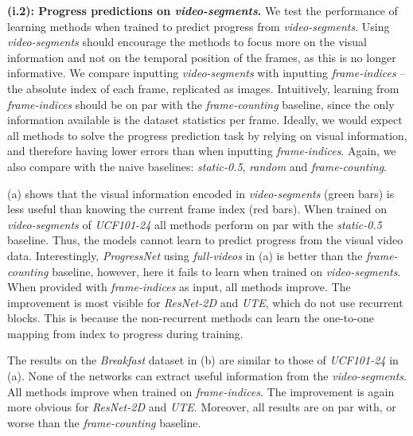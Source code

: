 \medskip\noindent\textbf{(i.2): Progress predictions on \textsl{video-segments}.}
We test the performance of learning methods when trained to predict progress from \textsl{video-segments}.
Using \textsl{video-segments} should encourage the methods to focus more on the visual information and not on the temporal position of the frames, as this is no longer informative. 
We compare inputting \textsl{video-segments} with inputting \textsl{frame-indices} -- the absolute index of each frame, replicated as images.
Intuitively, learning from \textsl{frame-indices} should be on par with the \textsl{frame-counting} baseline, since the only information available is the dataset statistics per frame.
Ideally, we would expect all methods to solve the progress prediction task by relying on visual information, and therefore having lower errors than when inputting \textsl{frame-indices}.
Again, we also compare with the naive baselines: \textsl{static-0.5}, \textsl{random} and \textsl{frame-counting}. 

(a) shows that the visual information encoded in \textsl{video-segments} (green bars) is less useful than knowing the current frame index (red bars).
When trained on \textsl{video-segments} of \textsl{UCF101-24} all methods perform on par with the \textsl{static-0.5} baseline.
Thus, the models cannot learn to predict progress from the visual video data. 
Interestingly, \textsl{ProgressNet} using \textsl{full-videos} in (a) is better than the \textsl{frame-counting} baseline, however, here it fails to learn when trained on \textsl{video-segments}. 
When provided with \textsl{frame-indices} as input, all methods improve. 
The improvement is most visible for \textsl{ResNet-2D} and \textsl{UTE}, which do not use recurrent blocks. 
This is because the non-recurrent methods can learn the one-to-one mapping from index to progress during training. 

The results on the \textsl{Breakfast} dataset in (b) are similar to those of \textsl{UCF101-24} in (a). 
None of the networks can extract useful information from the \textsl{video-segments}.
All methods improve when trained on \textsl{frame-indices}.
The improvement is again more obvious for \textsl{ResNet-2D} and \textsl{UTE}.
Moreover, all results are on par with, or worse than the \textsl{frame-counting} baseline. 

